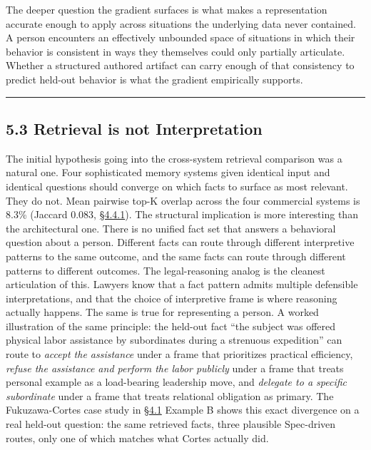 The deeper question the gradient surfaces is what makes a representation
accurate enough to apply across situations the underlying data never
contained. A person encounters an effectively unbounded space of
situations in which their behavior is consistent in ways they themselves
could only partially articulate. Whether a structured authored artifact
can carry enough of that consistency to predict held-out behavior is
what the gradient empirically supports.

\begin{center}\rule{0.5\linewidth}{0.5pt}\end{center}

\hypertarget{retrieval-is-not-interpretation}{%
\subsection{5.3 Retrieval is not
Interpretation}\label{retrieval-is-not-interpretation}}

The initial hypothesis going into the cross-system retrieval comparison
was a natural one. Four sophisticated memory systems given identical
input and identical questions should converge on which facts to surface
as most relevant. They do not. Mean pairwise top-K overlap across the
four commercial systems is 8.3\% (Jaccard 0.083, \hyperref[cross-system-retrieval-providers-do-not-converge]{§4.4.1}). The structural
implication is more interesting than the architectural one. There is no
unified fact set that answers a behavioral question about a person.
Different facts can route through different interpretive patterns to the
same outcome, and the same facts can route through different patterns to
different outcomes. The legal-reasoning analog is the cleanest
articulation of this. Lawyers know that a fact pattern admits multiple
defensible interpretations, and that the choice of interpretive frame is
where reasoning actually happens. The same is true for representing a
person. A worked illustration of the same principle: the held-out fact
``the subject was offered physical labor assistance by subordinates
during a strenuous expedition'' can route to \emph{accept the
assistance} under a frame that prioritizes practical efficiency,
\emph{refuse the assistance and perform the labor publicly} under a
frame that treats personal example as a load-bearing leadership move,
and \emph{delegate to a specific subordinate} under a frame that treats
relational obligation as primary. The Fukuzawa-Cortes case study in \hyperref[the-cross-subject-gradient-and-its-per-question-mechanism]{§4.1}
Example B shows this exact divergence on a real held-out question: the
same retrieved facts, three plausible Spec-driven routes, only one of
which matches what Cortes actually did.

